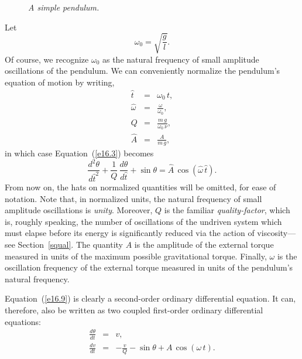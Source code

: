 \begin{figure}
\epsfysize=2.5in
\centerline{}
\caption{\em A simple pendulum.}\label{cf1}
\end{figure}

Let
\begin{equation}
\omega_0 = \sqrt{\frac{g}{l}}.
\end{equation}
Of course, we recognize $\omega_0$ as the natural  frequency of small
amplitude oscillations of the pendulum. We can conveniently normalize the
pendulum's equation of motion by writing,
\begin{eqnarray}
\hat{t} &=& \omega_0\,t,\\[0.5ex]
\hat{\omega} &=& \frac{\omega}{\omega_0},\\[0.5ex]
Q &=& \frac{m\,g}{\omega_0\,\nu},\\[0.5ex]
\hat{A} &=& \frac{A}{m\,g},
\end{eqnarray}
in which case Equation~(\ref{e16.3}) becomes
\begin{equation}\label{e16.9}
\frac{d^2\theta}{d\hat{t}^2} + \frac{1}{Q}\,\frac{d\theta}{d\hat{t}}
+ \sin\theta = \hat{A}\,\cos(\hat{\omega}\,\hat{t}).
\end{equation}
From now on, the hats on normalized quantities will be omitted, for ease of
notation. Note that, in normalized units, the natural frequency of small amplitude
oscillations is {\em unity}. Moreover, $Q$ is the familiar {\em quality-factor}, which is, roughly speaking,
the number of oscillations of the undriven system which must
elapse before its energy is significantly
reduced via the action of viscosity---see Section~\ref{squal}. The quantity $A$ is the amplitude of the external
torque measured in units of the maximum possible gravitational torque. Finally,
$\omega$ is the oscillation frequency of the external torque measured in units of the
pendulum's natural frequency.

Equation~(\ref{e16.9}) is clearly a second-order ordinary differential equation. It can, therefore, also be written as
two coupled first-order ordinary differential equations:
\begin{eqnarray}
\frac{d\theta}{dt} &=& v,\label{e16.11}\\[0.5ex]
\frac{dv}{dt} &=& -\frac{v}{Q} -\sin\theta + A\,\cos(\omega\, t).\label{e16.12}
\end{eqnarray}


